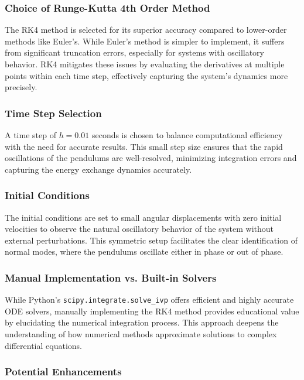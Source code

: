 \documentclass[12pt]{report} %
\begin{document}
    \subsubsection{Choice of Runge-Kutta 4th Order Method}
    
    The RK4 method is selected for its superior accuracy compared to lower-order methods like Euler's. While Euler's method is simpler to implement, it suffers from significant truncation errors, especially for systems with oscillatory behavior. RK4 mitigates these issues by evaluating the derivatives at multiple points within each time step, effectively capturing the system's dynamics more precisely.
    
    \subsubsection{Time Step Selection}
    
    A time step of \( h = 0.01 \) seconds is chosen to balance computational efficiency with the need for accurate results. This small step size ensures that the rapid oscillations of the pendulums are well-resolved, minimizing integration errors and capturing the energy exchange dynamics accurately.
    
    \subsubsection{Initial Conditions}
    
    The initial conditions are set to small angular displacements with zero initial velocities to observe the natural oscillatory behavior of the system without external perturbations. This symmetric setup facilitates the clear identification of normal modes, where the pendulums oscillate either in phase or out of phase.
    
    \subsubsection{Manual Implementation vs. Built-in Solvers}
    
    While Python's \texttt{scipy.integrate.solve\_ivp} offers efficient and highly accurate ODE solvers, manually implementing the RK4 method provides educational value by elucidating the numerical integration process. This approach deepens the understanding of how numerical methods approximate solutions to complex differential equations.
    
    \subsubsection{Potential Enhancements}
    
\end{document}
